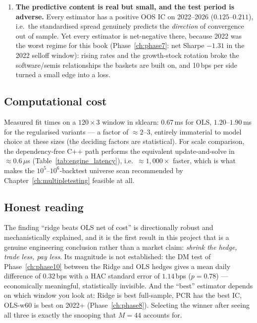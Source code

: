 \begin{enumerate}[label=\textbf{M\arabic*.}]
    explanation is the eigenstructure argument of Section~\ref{sec:pca:derivation}: the
    first principal component is the common sector/market mode, so projecting onto it
    removes the market drift cleanly (hence a crisp, informative signal) but discards the
    idiosyncratic relative moves that the mean-reversion trade actually monetises, and
    under-hedges the names' common drift --- leaving the book exposed to a residual factor
    it no longer measures. High IC, poor transfer coefficient
    (Section~\ref{sec:nonlinear:fundamentallaw}).
  \item \textbf{The predictive content is real but small, and the test period is adverse.}
    Every estimator has a positive OOS IC on 2022--2026 ($0.125$--$0.211$), i.e.\ the
    standardised spread genuinely predicts the \emph{direction} of convergence out of
    sample. Yet every estimator is net-negative there, because 2022 was the worst regime
    for this book (Phase~\ref{ch:phase7}: net Sharpe $-1.31$ in the 2022 selloff window):
    rising rates and the growth-stock rotation broke the software/semis relationships the
    baskets are built on, and 10\,bps per side turned a small edge into a loss.
\end{enumerate}

\subsection{Computational cost}

Measured fit times on a $120\times3$ window in sklearn: $0.67$\,ms for OLS,
$1.20$--$1.90$\,ms for the regularised variants --- a factor of $\approx2$--$3$, entirely
immaterial to model choice at these sizes (the deciding factors are statistical). For
scale comparison, the dependency-free C++ path performs the equivalent update-and-solve in
$\approx0.6\,\mu$s (Table~\ref{tab:engine_latency}), i.e.\ $\approx1{,}000\times$ faster,
which is what makes the $10^{5}$--$10^{6}$-backtest universe scan recommended by
Chapter~\ref{ch:multipletesting} feasible at all.

\subsection{Honest reading}

The finding ``ridge beats OLS net of cost'' is directionally robust and mechanistically
explained, and it is the first result in this project that is a genuine engineering
conclusion rather than a market claim: \emph{shrink the hedge, trade less, pay less}.
Its magnitude is not established: the DM test of Phase~\ref{ch:phase10} between the
Ridge and OLS hedges gives a mean daily difference of $0.32$\,bps with a HAC standard
error of $1.14$\,bps ($p=0.78$) --- economically meaningful, statistically invisible.
And the ``best'' estimator depends on which window you look at: Ridge is best full-sample,
PCR has the best IC, OLS-w60 is best on 2022+ (Phase~\ref{ch:phase8}). Selecting the
winner after seeing all three is exactly the snooping that $M=44$ accounts for.

